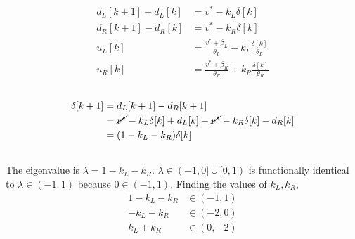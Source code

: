 \documentclass[]{article}
\begin{document}
\begin{align}
	d_L[k + 1] - d_L[k] &= v^\ast - k_L\delta[k] \\
	d_R[k + 1] - d_R[k] &= v^\ast - k_R\delta[k] \\
	u_L[k] &= \frac{v^\ast + \beta_L}{\theta_L} - k_L \frac{\delta[k]}{\theta_L} \\
	u_R[k] &= \frac{v^\ast + \beta_R}{\theta_R} + k_R \frac{\delta[k]}{\theta_R}
\end{align}

\subsection{}

\begin{align}
	\delta[k + 1] &= d_L[k + 1] - d_R[k + 1] \\
	&= \cancel{v^\ast} - k_L\delta[k] + d_L[k] - \cancel{v^\ast} - k_R\delta[k] - d_R[k] \\
	&= (1 - k_L - k_R) \delta[k]
\end{align}

\subsection{}

The eigenvalue is \(\lambda = 1 - k_L - k_R\).
\(\lambda \in (-1, 0] \cup [0, 1)\) is functionally identical to \(\lambda \in (-1, 1)\) because \(0 \in (-1, 1)\).
Finding the values of \(k_L, k_R\),
\begin{align}
	1 - k_L - k_R &\in (-1, 1) \\
	-k_L - k_R &\in (-2, 0) \\
	k_L + k_R &\in (0, -2)
\end{align}

\subsection{}
\end{document}
